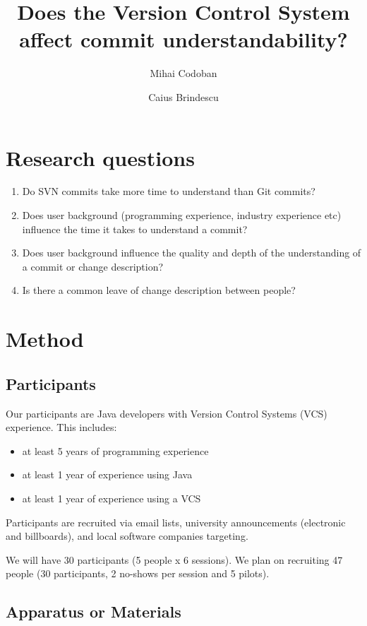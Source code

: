 \documentclass[letterpaper]{article}
\title{Does the Version Control System affect commit understandability?}
\author{Mihai Codoban \and Caius Brindescu}
\date{}
\begin{document}
\maketitle

\section{Research questions}

\begin{enumerate}
	\item Do SVN commits take more time to understand than Git commits?
	\item Does user background (programming experience, industry experience etc) influence the time it takes to understand a commit?
	\item Does user background influence the quality and depth of the understanding of a commit or change description?
	\item Is there a common leave of change description between people?
\end{enumerate}

\section{Method}

\subsection{Participants}

Our participants are Java developers with Version Control Systems (VCS) experience. 
This includes:
\begin{itemize}
	\item at least 5 years of programming experience
	\item at least 1 year of experience using Java
	\item at least 1 year of experience using a VCS
\end{itemize}

Participants are recruited via email lists, university announcements (electronic and billboards), and local software companies targeting.

We will have 30 participants (5 people x 6 sessions). 
We plan on recruiting 47 people (30 participants, 2 no-shows per session and 5 pilots).

\subsection{Apparatus or Materials}
\end{document}
